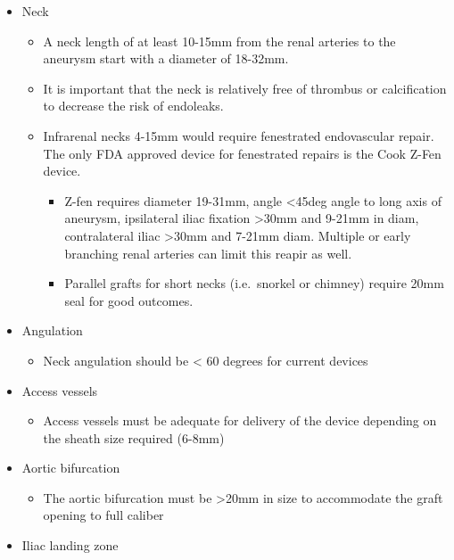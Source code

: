 \documentclass[
]{book}
\providecommand{\tightlist}{%
  \setlength{\itemsep}{0pt}\setlength{\parskip}{0pt}}
\begin{document}
\begin{itemize}
  \begin{itemize}
  \item
    Neck

    \begin{itemize}
    \item
      A neck length of at least 10-15mm from the renal arteries to
      the aneurysm start with a diameter of 18-32mm.
    \item
      It is important that the neck is relatively free of thrombus
      or calcification to decrease the risk of endoleaks.
    \item
      Infrarenal necks 4-15mm would require fenestrated
      endovascular repair. The only FDA approved device for
      fenestrated repairs is the Cook Z-Fen
      device.\citep{oderichResultsUnitedStates2014}

      \begin{itemize}
      \item
        Z-fen requires diameter 19-31mm, angle \textless45deg angle to
        long axis of aneurysm, ipsilateral iliac fixation \textgreater30mm
        and 9-21mm in diam, contralateral iliac \textgreater30mm and 7-21mm
        diam. Multiple or early branching renal arteries can
        limit this reapir as well.
        \citep{oderichTechnicalAspectsRepair2014}
      \item
        Parallel grafts for short necks (i.e.~snorkel or
        chimney) require 20mm seal for good outcomes.
        \citep{donasCollectedWorldExperience2015}
      \end{itemize}
    \end{itemize}
  \item
    Angulation

    \begin{itemize}
    \tightlist
    \item
      Neck angulation should be \textless{} 60 degrees for current devices
    \end{itemize}
  \item
    Access vessels

    \begin{itemize}
    \tightlist
    \item
      Access vessels must be adequate for delivery of the device
      depending on the sheath size required (6-8mm)
    \end{itemize}
  \item
    Aortic bifurcation

    \begin{itemize}
    \tightlist
    \item
      The aortic bifurcation must be \textgreater20mm in size to accommodate
      the graft opening to full caliber
    \end{itemize}
  \item
    Iliac landing zone


\end{itemize}
\end{itemize}
\end{document}
